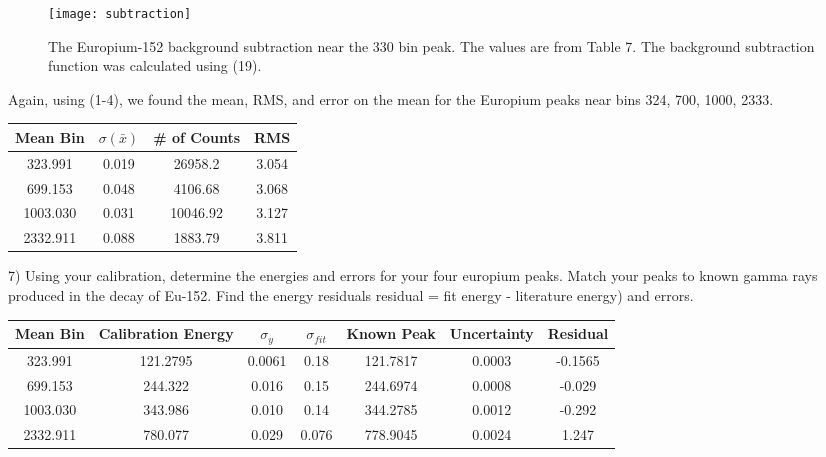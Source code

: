 \documentclass[10pt]{article}
\begin{document}
\newpage
\begin{figure}[!h]
\texttt{[image: subtraction]}
\caption{The Europium-152 background subtraction near the 330 bin peak. The values are from Table 7. The background subtraction function was calculated using (19).}
\end{figure}
Again, using (1-4), we found the mean, RMS, and error on the mean for the Europium peaks near bins 324, 700, 1000, 2333.
\begin{center}
\begin{tabular}{|c|c|c|c|}
\hline 
Mean Bin & $\sigma(\bar{x})$ & \# of Counts & RMS \\ 
\hline 
323.991 & 0.019 & 26958.2 & 3.054 \\ 
\hline 
699.153 & 0.048 & 4106.68 & 3.068  \\ 
\hline 
1003.030 & 0.031 & 10046.92 & 3.127  \\ 
\hline 
2332.911 & 0.088 & 1883.79 & 3.811  \\ 
\hline 
\end{tabular}
\end{center}
\begin{flushleft}
7) Using your calibration, determine the energies and errors for your four europium peaks. Match your peaks to known gamma rays produced in the decay of Eu-152. Find the energy residuals residual = fit energy - literature energy) and errors. 
\end{flushleft}
\begin{center}
\begin{tabular}{|c|c|c|c|c|c|c|}
\hline 
Mean Bin & Calibration Energy & $\sigma_{y}$ & $\sigma_{fit}$ & Known Peak & Uncertainty & Residual  \\ 
\hline 
323.991 & 121.2795 & 0.0061 & 0.18 & 121.7817 & 0.0003 & -0.1565 \\ 
\hline 
699.153 & 244.322 & 0.016 & 0.15 & 244.6974 & 0.0008 & -0.029 \\ 
\hline 
1003.030 & 343.986 & 0.010 & 0.14 & 344.2785 & 0.0012 & -0.292 \\ 
\hline 
2332.911 & 780.077 & 0.029 & 0.076 & 778.9045 & 0.0024 & 1.247 \\ 
\hline 
\end{tabular}
\end{center}
\end{document}
